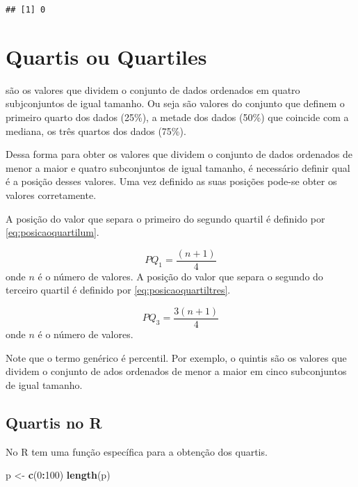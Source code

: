 \documentclass[
]{book}
\newenvironment{Shaded}{\begin{snugshade}}{\end{snugshade}}
\newcommand{\DecValTok}[1]{\textcolor[rgb]{0.00,0.00,0.81}{#1}}
\newcommand{\KeywordTok}[1]{\textcolor[rgb]{0.13,0.29,0.53}{\textbf{#1}}}
\newcommand{\NormalTok}[1]{#1}
\newcommand{\OperatorTok}[1]{\textcolor[rgb]{0.81,0.36,0.00}{\textbf{#1}}}
\newcommand{\StringTok}[1]{\textcolor[rgb]{0.31,0.60,0.02}{#1}}
\begin{document}
\begin{verbatim}
## [1] 0
\end{verbatim}

\hypertarget{quartis-ou-quartiles}{%
\section{Quartis ou Quartiles}\label{quartis-ou-quartiles}}

são os valores que dividem o conjunto de dados ordenados em quatro subjconjuntos
de igual tamanho. Ou seja são valores do conjunto que definem o primeiro quarto
dos dados (25\%), a metade dos dados (50\%) que coincide com a mediana, os três
quartos dos dados (75\%).

Dessa forma para obter os valores que dividem o conjunto de dados ordenados de menor a maior e quatro subconjuntos de igual tamanho, é necessário definir qual é a posição desses valores. Uma vez definido as suas posições pode-se obter os valores corretamente.

A posição do valor que separa o primeiro do segundo quartil é definido por \eqref{eq:posicaoquartilum}.

\begin{equation}
  PQ_1 = \dfrac{(n +1)}{4}
  \label{eq:posicaoquartilum}
\end{equation}
onde \(n\) é o número de valores.
A posição do valor que separa o segundo do terceiro quartil é definido por \eqref{eq:posicaoquartiltres}.

\begin{equation}
  PQ_3 = \dfrac{3(n +1)}{4}
  \label{eq:posicaoquartiltres}
\end{equation}
onde \(n\) é o número de valores.

Note que o termo genérico é percentil. Por exemplo, o quintis são os valores que dividem o conjunto de ados ordenados de menor a maior em cinco subconjuntos de igual tamanho.

\hypertarget{quartis-no-r}{%
\subsection{Quartis no R}\label{quartis-no-r}}

No R tem uma função específica para a obtenção dos quartis.

\begin{Shaded}
\begin{Highlighting}[]
\NormalTok{p <-}\StringTok{ }\KeywordTok{c}\NormalTok{(}\DecValTok{0}\OperatorTok{:}\DecValTok{100}\NormalTok{)}
\KeywordTok{length}\NormalTok{(p)}
\end{Highlighting}
\end{Shaded}
\end{document}
